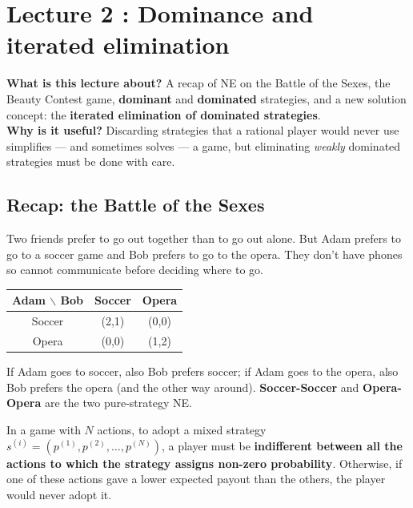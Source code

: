 \documentclass[11pt,a4paper,openany]{book}
\begin{document}
\chapter{Lecture 2 : Dominance and iterated elimination}

\begin{rembox}[title=In a nutshell]
\textbf{What is this lecture about?} A recap of NE on the Battle of the Sexes, the Beauty
Contest game, \textbf{dominant} and \textbf{dominated} strategies, and a new solution
concept: the \textbf{iterated elimination of dominated strategies}. \\
\textbf{Why is it useful?} Discarding strategies that a rational player would never use
simplifies --- and sometimes solves --- a game, but eliminating \emph{weakly} dominated
strategies must be done with care.
\end{rembox}

\section{Recap: the Battle of the Sexes}

\begin{exbox}[title=Battle of the Sexes]
Two friends prefer to go out together than to go out alone. But Adam prefers to go to a
soccer game and Bob prefers to go to the opera. They don't have phones so cannot communicate
before deciding where to go.
\begin{center}
\begin{tabular}{c|cc}
Adam $\backslash$ Bob & Soccer & Opera \\ \hline
Soccer & (2,1) & (0,0) \\
Opera  & (0,0) & (1,2)
\end{tabular}
\end{center}
If Adam goes to soccer, also Bob prefers soccer; if Adam goes to the opera, also Bob prefers
the opera (and the other way around). \textbf{Soccer-Soccer} and \textbf{Opera-Opera} are the
two pure-strategy NE.
\end{exbox}


\begin{thmbox}[title=Indifference principle]
In a game with $N$ actions, to adopt a mixed strategy
$s^{(i)} = (p^{(1)}, p^{(2)}, \ldots, p^{(N)})$, a player must be \textbf{indifferent
between all the actions to which the strategy assigns non-zero probability}. Otherwise, if
one of these actions gave a lower expected payout than the others, the player would never
adopt it.
\end{thmbox}
\end{document}

